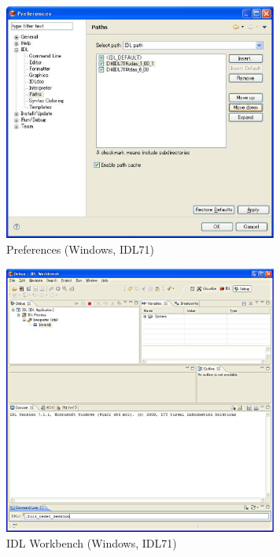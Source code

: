 \documentclass[a4j]{jbook}
\begin{document}
\begin{figure}[H]
\begin{center}
\includegraphics[width=9cm]{images/fig_idl71/Fig5.eps}
\caption{Preferences (Windows, IDL71)}
\label{idl71/Fig5.eps}
\end{center}
\end{figure}

\begin{figure}[H]
\begin{center}
\includegraphics[width=9cm]{images/fig_idl71/Fig6.eps}
\caption{IDL Workbench (Windows, IDL71)}
\label{idl71/Fig6.eps}
\end{center}
\end{figure}

\end{document}
